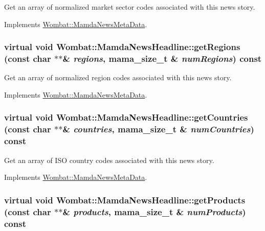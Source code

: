 Get an array of normalized market sector codes associated with this news story. 



Implements \hyperlink{classWombat_1_1MamdaNewsMetaData_f3882b3a14540a56a2a58d863755549d}{Wombat::Mamda\-News\-Meta\-Data}.\hypertarget{classWombat_1_1MamdaNewsHeadline_7f6db5ebceef1b50448604c270d31c4f}{
\subsubsection[getRegions]{\setlength{\rightskip}{0pt plus 5cm}virtual void Wombat::Mamda\-News\-Headline::get\-Regions (const char $\ast$$\ast$\& {\em regions}, mama\_\-size\_\-t \& {\em num\-Regions}) const}}
\label{classWombat_1_1MamdaNewsHeadline_7f6db5ebceef1b50448604c270d31c4f}


Get an array of normalized region codes associated with this news story. 



Implements \hyperlink{classWombat_1_1MamdaNewsMetaData_8eaa05007b92a32e985794c6b326b639}{Wombat::Mamda\-News\-Meta\-Data}.\hypertarget{classWombat_1_1MamdaNewsHeadline_9f753e8e23984a3f229cd860f031cb7a}{
\subsubsection[getCountries]{\setlength{\rightskip}{0pt plus 5cm}virtual void Wombat::Mamda\-News\-Headline::get\-Countries (const char $\ast$$\ast$\& {\em countries}, mama\_\-size\_\-t \& {\em num\-Countries}) const}}
\label{classWombat_1_1MamdaNewsHeadline_9f753e8e23984a3f229cd860f031cb7a}


Get an array of ISO country codes associated with this news story. 



Implements \hyperlink{classWombat_1_1MamdaNewsMetaData_c91f16ff5d1b843a872254a5e8493cc3}{Wombat::Mamda\-News\-Meta\-Data}.\hypertarget{classWombat_1_1MamdaNewsHeadline_d1b777bc5eab51d090ace0e858e15649}{
\subsubsection[getProducts]{\setlength{\rightskip}{0pt plus 5cm}virtual void Wombat::Mamda\-News\-Headline::get\-Products (const char $\ast$$\ast$\& {\em products}, mama\_\-size\_\-t \& {\em num\-Products}) const}}
\label{classWombat_1_1MamdaNewsHeadline_d1b777bc5eab51d090ace0e858e15649}


